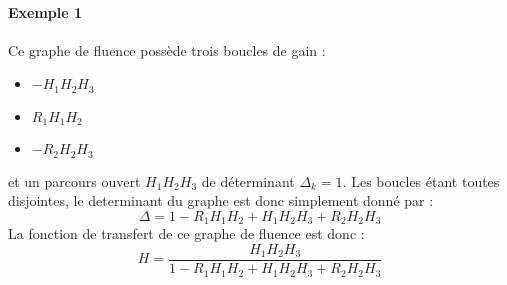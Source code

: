

\paragraph{Exemple 1}

\begin{center}
\end{center}
Ce graphe de fluence possède trois boucles de gain :
\begin{itemize}
    \item $-H_1H_2H_3$
    \item $R_1H_1H_2$
    \item $-R_2H_2H_3$ 
\end{itemize}
et un parcours ouvert $H_1H_2H_3$ de déterminant $\Delta_k=1$. Les boucles étant toutes 
disjointes, le determinant du graphe est donc simplement donné par :
$$
\Delta=1-R_1H_1H_2+H_1H_2H_3+R_2H_2H_3
$$
La fonction de transfert de ce graphe de fluence est donc :
$$
H=\dfrac{H_1H_2H_3}{1-R_1H_1H_2+H_1H_2H_3+R_2H_2H_3}
$$

